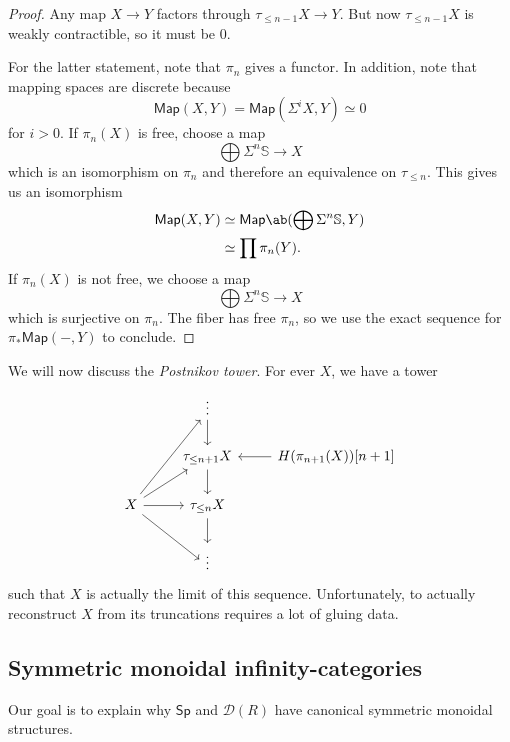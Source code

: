 \documentclass[10pt, oneside]{memoir}
\theoremstyle{definition}
\theoremstyle{remark}
\theoremstyle{plain}
\theoremstyle{definition}
\theoremstyle{remark}
\newcommand{\bS}{\mathbb{S}}
\newcommand{\mc}[1]{\mathcal{#1}}
\newcommand{\ms}[1]{\mathsf{#1}}
\newcommand{\1}{\mathbf{1}}
\newcommand{\2}{\mathbf{2}}
\newcommand{\3}{\mathbf{3}}
\begin{document}
\begin{proof}
    Any map $X \to Y$ factors through $\tau_{\leq n-1} X \to Y$. But now $\tau_{\leq n-1} X$ is weakly contractible, so it must be $0$.

    For the latter statement, note that $\pi_n$ gives a functor. In addition, note that mapping spaces are discrete because
    \[ \ms{Map}(X, Y) = \ms{Map}(\Sigma^i X, Y) \simeq 0 \]
    for $i > 0$. If $\pi_n(X)$ is free, choose a map
    \[ \bigoplus \Sigma^n \bS \to X \]
    which is an isomorphism on $\pi_n$ and therefore an equivalence on $\tau_{\leq n}$. This gives us an isomorphism
    \begin{align*}
        \ms{Map}(X, Y) &\simeq \ms{Map} \ab(\bigoplus \Sigma^n \bS, Y) \\
        &\simeq \prod \pi_n(Y).
    \end{align*}
    If $\pi_n(X)$ is not free, we choose a map
    \[ \bigoplus \Sigma^n \bS \to X \]
    which is surjective on $\pi_n$. The fiber has free $\pi_n$, so we use the exact sequence for $\pi_* \ms{Map}(-, Y)$ to conclude.
\end{proof}

We will now discuss the \textit{Postnikov tower}. For ever $X$, we have a tower
\begin{equation*}
\begin{tikzcd}
    & \vdots \ar{d} \\
    & \tau_{\leq n+1} X \ar{d} & H(\pi_{n+1}(X))[n+1] \ar{l} \\
    X \ar{uur} \ar{ur} \ar{r} \ar{dr} & \tau_{\leq n} X \ar{d} \\
    & \vdots
\end{tikzcd}
\end{equation*}
such that $X$ is actually the limit of this sequence. Unfortunately, to actually reconstruct $X$ from its truncations requires a lot of gluing data.


\subsection{Symmetric monoidal infinity-categories}%
\label{sub:Symmetric monoidal infinity-categories}

Our goal is to explain why $\ms{Sp}$ and $\mc{D}(R)$ have canonical symmetric monoidal structures.
\end{document}
